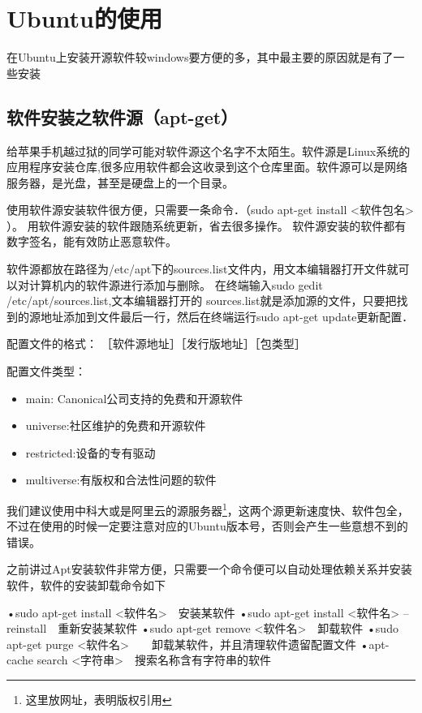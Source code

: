 \section{Ubuntu的使用}
在Ubuntu上安装开源软件较windows要方便的多，其中最主要的原因就是有了一些安装
\subsection{软件安装之软件源（apt-get）}
 给苹果手机越过狱的同学可能对软件源这个名字不太陌生。软件源是Linux系统的应用程序安装仓库,很多应用软件都会这收录到这个仓库里面。软件源可以是网络服务器，是光盘，甚至是硬盘上的一个目录。
 
 使用软件源安装软件很方便，只需要一条命令．（sudo apt-get install <软件包名> ）。
 用软件源安装的软件跟随系统更新，省去很多操作。
 软件源安装的软件都有数字签名，能有效防止恶意软件。
 　　

  软件源都放在路径为/etc/apt下的sources.list文件内，用文本编辑器打开文件就可以对计算机内的软件源进行添加与删除。
  在终端输入sudo gedit /etc/apt/sources.list,文本编辑器打开的 sources.list就是添加源的文件，只要把找到的源地址添加到文件最后一行，然后在终端运行sudo apt-get update更新配置．
  
   配置文件的格式：
   ［软件源地址］［发行版地址］［包类型］
   
   配置文件类型：
   \begin{itemize}
   	\item main: Canonical公司支持的免费和开源软件
   	\item universe:社区维护的免费和开源软件
   	\item restricted:设备的专有驱动
   	\item multiverse:有版权和合法性问题的软件
   \end{itemize}
   
  我们建议使用中科大或是阿里云的源服务器\footnote{这里放网址，表明版权引用}，这两个源更新速度快、软件包全，不过在使用的时候一定要注意对应的Ubuntu版本号，否则会产生一些意想不到的错误。
   
 之前讲过Apt安装软件非常方便，只需要一个命令便可以自动处理依赖关系并安装软件，软件的安装卸载命令如下
 \begin{Code}
 •sudo apt-get install  <软件名>　安装某软件
 •sudo apt-get install  <软件名> --reinstall　重新安装某软件
 •sudo apt-get remove <软件名>　卸载软件
 •sudo apt-get purge <软件名>　　卸载某软件，并且清理软件遗留配置文件
 •apt-cache search <字符串>　搜索名称含有字符串的软件
 \end{Code}
 
